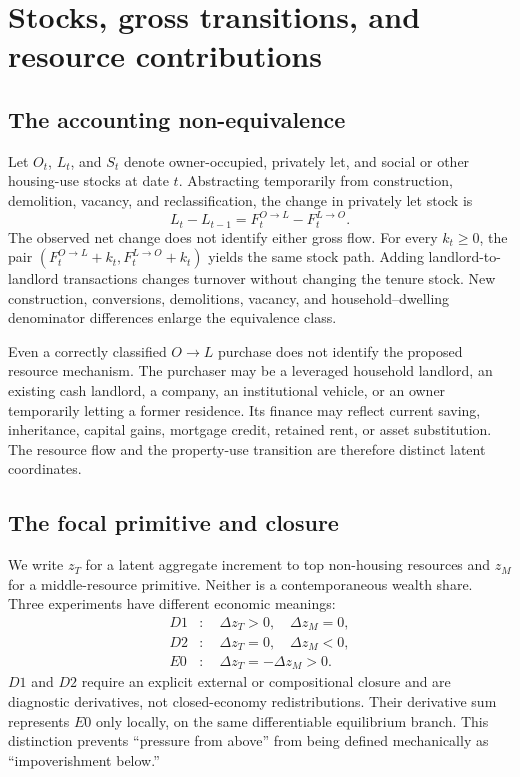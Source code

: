 \documentclass[11pt]{article}
\begin{document}
\section{Stocks, gross transitions, and resource contributions}
\label{sec:ontology}

\subsection{The accounting non-equivalence}

Let $O_t$, $L_t$, and $S_t$ denote owner-occupied, privately let, and social or
other housing-use stocks at date $t$. Abstracting temporarily from construction,
demolition, vacancy, and reclassification, the change in privately let stock is
\begin{equation}
  L_t-L_{t-1}=F^{O\rightarrow L}_t-F^{L\rightarrow O}_t.
  \label{eq:stockflow}
\end{equation}
The observed net change does not identify either gross flow. For every $k_t\geq0$,
the pair $(F^{O\rightarrow L}_t+k_t,F^{L\rightarrow O}_t+k_t)$ yields the same
stock path. Adding landlord-to-landlord transactions changes turnover without
changing the tenure stock. New construction, conversions, demolitions, vacancy,
and household--dwelling denominator differences enlarge the equivalence class.

Even a correctly classified $O\rightarrow L$ purchase does not identify the
proposed resource mechanism. The purchaser may be a leveraged household landlord,
an existing cash landlord, a company, an institutional vehicle, or an owner
temporarily letting a former residence. Its finance may reflect current saving,
inheritance, capital gains, mortgage credit, retained rent, or asset substitution.
The resource flow and the property-use transition are therefore distinct latent
coordinates.

\subsection{The focal primitive and closure}

We write $z_T$ for a latent aggregate increment to top non-housing resources and
$z_M$ for a middle-resource primitive. Neither is a contemporaneous wealth share.
Three experiments have different economic meanings:
\begin{align*}
  D1 &: \quad \Delta z_T>0,\quad \Delta z_M=0, \\
  D2 &: \quad \Delta z_T=0,\quad \Delta z_M<0, \\
  E0 &: \quad \Delta z_T=-\Delta z_M>0.
\end{align*}
$D1$ and $D2$ require an explicit external or compositional closure and are
diagnostic derivatives, not closed-economy redistributions. Their derivative sum
represents $E0$ only locally, on the same differentiable equilibrium branch. This
distinction prevents ``pressure from above'' from being defined mechanically as
``impoverishment below.''
\end{document}
